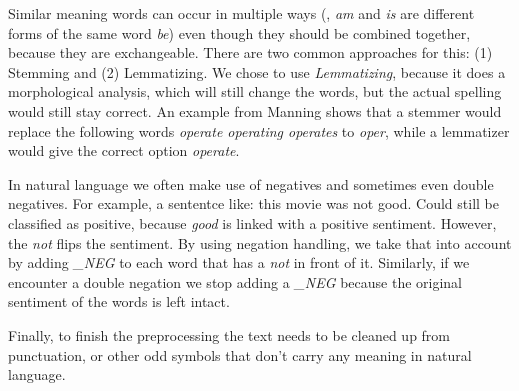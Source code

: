 Similar meaning words can occur in multiple ways (\eg, \textit{am} and \textit{is} are different forms of the same word \textit{be}) even though they should be combined together, because they are exchangeable.
There are two common approaches for this: (1) Stemming and (2) Lemmatizing. 
We chose to use \textit{Lemmatizing}, because it does a morphological analysis, which will still change the words, but the actual spelling would still stay correct.
An example from Manning \etal \cite{Manning:2008} shows that a stemmer would replace the following words \textit{operate operating operates} to \textit{oper}, while a lemmatizer would give the correct option \textit{operate}.

In natural language we often make use of negatives and sometimes even double negatives. For example, a sententce like: this movie was not good.
Could still be classified as positive, because \textit{good} is linked with a positive sentiment. However, the \textit{not} flips the sentiment.
By using negation handling, we take that into account by adding \textit{\_NEG} to each word that has a \textit{not} in front of it.
Similarly, if we encounter a double negation we stop adding a \textit{\_NEG} because the original sentiment of the words is left intact.

Finally, to finish the preprocessing the text needs to be cleaned up from punctuation, or other odd symbols that don't carry any meaning in natural language.
